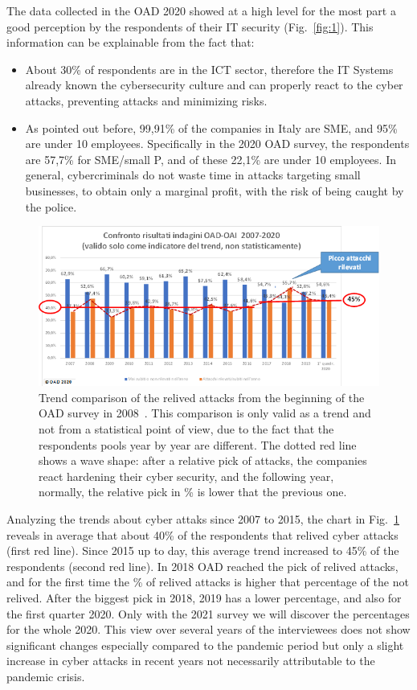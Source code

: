 \documentclass{easychair}
\begin{document}
The data collected in the OAD 2020 showed at a high level for the most part a good perception by the respondents of their IT security (Fig.~\ref{fig:1}).
This information can be explainable from the fact that:
 
\begin{itemize}
\item About 30\% of respondents are in the ICT sector, therefore the IT Systems already known the cybersecurity culture and can properly react to the cyber attacks, preventing 
attacks and minimizing risks.

\item As pointed out before, 99,91\% of the companies in Italy are SME, and 95\% are under 10 employees. Specifically in the 2020 OAD survey, the respondents are 57,7\% for 
SME/small P, and of these 22,1\% are under 10 employees. In general, cybercriminals do not waste time in attacks targeting small businesses, to obtain only a marginal profit, 
with the risk of being caught by the police.
\end{itemize}


\begin{figure}
	\centering
		\includegraphics[width=1\textwidth]{pictures/fig2.png}
		\caption{Trend comparison of the relived attacks from the beginning of the OAD survey in 2008~\cite{oad20}. This comparison is only valid as a trend and not from a statistical point 
of view, due to the fact that the respondents pools year by year are different. The dotted red line shows a wave shape: after a relative pick of attacks, the companies react hardening their cyber security, and the following year, normally, 
the relative pick in \% is lower that the previous one.}
		\label{fig:2}
\end{figure}

Analyzing the trends about cyber attaks since 2007 to 2015, the chart in Fig.~\ref{fig:2} reveals in average that about 40\% of the respondents that relived cyber attacks 
(first red line). Since 2015 up to day, this average trend increased to 45\% of the respondents (second red line). 
In 2018 OAD reached the pick of relived attacks, and  for the first time  the \% of relived attacks is higher that percentage of the not relived. After the biggest pick 
in 2018, 2019 has a lower percentage, and also for the first quarter 2020. Only with the 2021 survey we will discover the percentages for the whole 2020. 
This view over several years of the interviewees does not show significant changes especially compared to the pandemic period but only a slight increase in cyber attacks 
in recent years not necessarily attributable to the pandemic crisis.
\end{document}
